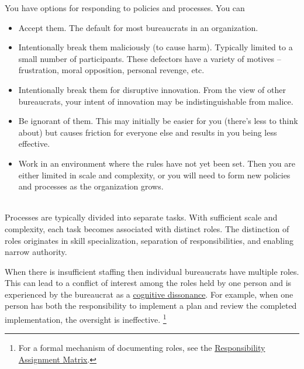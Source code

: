 You have options for responding to policies and processes. You can
\begin{itemize}
    \item Accept them. The default for most bureaucrats in an  organization.
    \item Intentionally break them maliciously (to cause harm). Typically limited to a small number of participants. These defectors have a variety of motives -- frustration, moral opposition, personal revenge, etc.
    \item Intentionally break them for disruptive innovation. 
    From the view of other bureaucrats, your intent of innovation may be indistinguishable from malice. 
    \item Be ignorant of them. This may initially be easier for you (there's less to think about) but causes friction for everyone else and results in you being less effective. 
    \item Work in an environment where the rules have not yet been set. Then you are either limited in scale and complexity, or you will need to form new policies and processes as the organization grows.
\end{itemize}

\ \\

Processes are typically divided into separate tasks. With sufficient scale and complexity, each task becomes associated with distinct roles. The distinction of roles originates in skill specialization, separation of responsibilities, and enabling narrow authority. 

When there is insufficient staffing then individual bureaucrats have multiple roles. This can lead to a conflict of interest among the roles held by one person and is experienced by the bureaucrat as a \href{https://en.wikipedia.org/wiki/Cognitive_dissonance}{cognitive dissonance}. 
For example, when one person has both the responsibility to implement a plan and review the completed implementation, the oversight is ineffective. \footnote{For a formal mechanism of documenting roles, see the 
\href{https://en.wikipedia.org/wiki/Responsibility_assignment_matrix}{Responsibility Assignment Matrix}.
}

